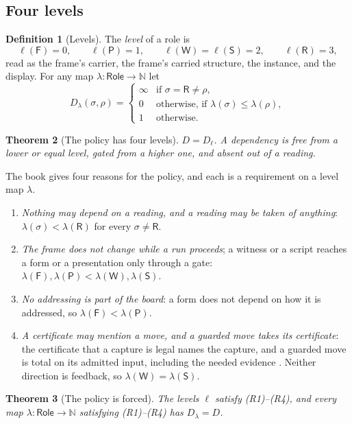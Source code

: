 \documentclass[11pt]{article}
\numberwithin{equation}{section}
\theoremstyle{definition}
\newtheorem{definition}{Definition}[section]
\theoremstyle{plain}
\newtheorem{theorem}[definition]{Theorem}
\theoremstyle{remark}
\newcommand{\Role}{\mathsf{Role}}
\newcommand{\Frm}{\mathsf F}
\newcommand{\Prs}{\mathsf P}
\newcommand{\Wit}{\mathsf W}
\newcommand{\Scr}{\mathsf S}
\newcommand{\Ren}{\mathsf R}
\newcommand{\absent}{\boldsymbol\infty}
\begin{document}
\subsection{Four levels}\label{sec:levels}

\begin{definition}[Levels]\label{def:levels}
The \emph{level} of a role is
\[
 \ell(\Frm)=0,\qquad
 \ell(\Prs)=1,\qquad
 \ell(\Wit)=\ell(\Scr)=2,\qquad
 \ell(\Ren)=3,
\]
read as the frame's carrier, the frame's carried structure, the instance,
and the display.  For any map \(\lambda:\Role\to\mathbb N\) let
\[
 D_\lambda(\sigma,\rho)=
 \begin{cases}
 \absent&\text{if }\sigma=\Ren\ne\rho,\\
 0&\text{otherwise, if }\lambda(\sigma)\le\lambda(\rho),\\
 1&\text{otherwise.}
 \end{cases}
\]
\end{definition}

\begin{theorem}[The policy has four levels]\label{thm:levels}
\(D=D_\ell\).  A dependency is free from a lower or equal level, gated from a
higher one, and absent out of a reading.
\end{theorem}

The book gives four reasons for the policy, and each is a requirement on a
level map \(\lambda\).
\begin{enumerate}[label=(R\arabic*),leftmargin=2.8em]
\item \emph{Nothing may depend on a reading, and a reading may be taken of
anything}: \(\lambda(\sigma)<\lambda(\Ren)\) for every \(\sigma\ne\Ren\).
\item \emph{The frame does not change while a run proceeds}; a witness or a
script reaches a form or a presentation only through a gate:
\(\lambda(\Frm),\lambda(\Prs)<\lambda(\Wit),\lambda(\Scr)\).
\item \emph{No addressing is part of the board}: a form does not depend on
how it is addressed, so \(\lambda(\Frm)<\lambda(\Prs)\).
\item \emph{A certificate may mention a move, and a guarded move takes its
certificate}: the certificate that a capture is legal names the capture, and
a guarded move is total on its admitted input, including the needed evidence
\cite[\S1.9]{Book}.  Neither direction is feedback, so
\(\lambda(\Wit)=\lambda(\Scr)\).
\end{enumerate}

\begin{theorem}[The policy is forced]\label{thm:forced}
The levels \(\ell\) satisfy \textup{(R1)--(R4)}, and every map
\(\lambda:\Role\to\mathbb N\) satisfying \textup{(R1)--(R4)} has
\(D_\lambda=D\).
\end{theorem}
\end{document}
